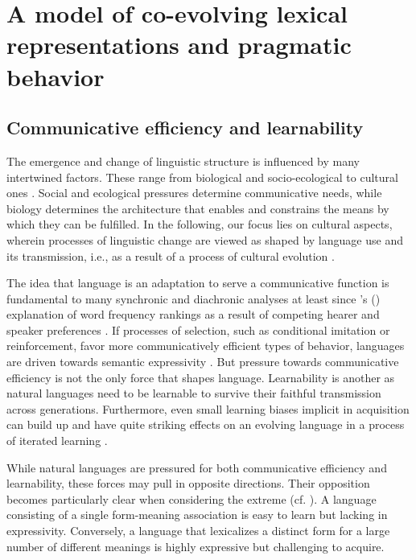 \documentclass[a4paper, 11pt]{article}
\theoremstyle{Satz}
\newcommand{\citeposs}[2][]{\citeauthor{#2}'s (\citeyear[#1]{#2})}
\begin{document}
\section{A model of co-evolving lexical representations and pragmatic behavior}
\label{sec:model}

\subsection{Communicative efficiency and learnability}

The emergence and change of linguistic structure is influenced by many intertwined
factors. These range from biological and socio-ecological to cultural ones \citep{benz+etal:2005b,steels:2011,tamariz+kirby:2016}. Social and ecological pressures determine communicative needs, while
biology determines the architecture that enables and constrains the means by which they can be
fulfilled. In the following, our focus lies on cultural aspects, wherein processes of
linguistic change are viewed as shaped by language use and its transmission, i.e., as a result
of a process of cultural evolution
\citep{Pagel2009:Human-Language-,ThompsonKirby2016:Culture-Shapes-}.

The idea that language is an adaptation to serve a communicative function is fundamental to
many synchronic and diachronic analyses at least since \citeposs{zipf:1949} explanation of word
frequency rankings as a result of competing hearer and speaker preferences \citep[e.g.,
in][]{martinet:1962, horn:1984,jaeger+vRooij:2007,jaeger:2007,
  piantadosi:2014,kirby+etal:2015}. If processes of selection, such as conditional imitation or
reinforcement, favor more communicatively efficient types of behavior, languages are driven
towards semantic expressivity \citep[e.g.,][]{nowak+krakauer:1999,Skyrms2010:Signals}. But
pressure towards communicative efficiency is not the only force that shapes
language. Learnability is another as natural languages need to be learnable to survive their
faithful transmission across generations. Furthermore, even small learning biases implicit in acquisition
can build up and have quite striking effects on an evolving language in a process of iterated
learning
\citep{KirbyHurford2002:The-Emergence-o,SmithKirby2003:Iterated-Learni,kirby+etal:2014}.

While natural languages are pressured for both communicative efficiency and learnability, these forces may
pull in opposite directions. Their opposition becomes particularly clear when considering the
extreme (cf. \citealt{kemp+regier:2012,kirby+etal:2015}). A language consisting of a single
form-meaning association is easy to learn but lacking in expressivity. Conversely, a language
that lexicalizes a distinct form for a large number of different meanings is highly expressive
but challenging to acquire.
\end{document}
